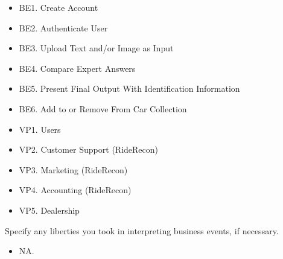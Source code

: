 \documentclass[]{article}
\begin{document}
\fi
{} 
\begin{itemize}
        \item BE1. Create Account
        \item BE2. Authenticate User
        \item BE3. Upload Text and/or Image as Input
        \item BE4. Compare Expert Answers
        \item BE5. Present Final Output With Identification Information
        \item BE6. Add to or Remove From Car Collection
\end{itemize}

\begin{itemize}
	\item VP1. Users
	\item VP2. Customer Support (RideRecon)
	\item VP3. Marketing (RideRecon)
	\item VP4. Accounting (RideRecon)
	\item VP5. Dealership
\end{itemize}

 Specify any liberties you took in interpreting business events, if necessary.
\begin{itemize}
	\item NA.
\end{itemize}
\end{document}
